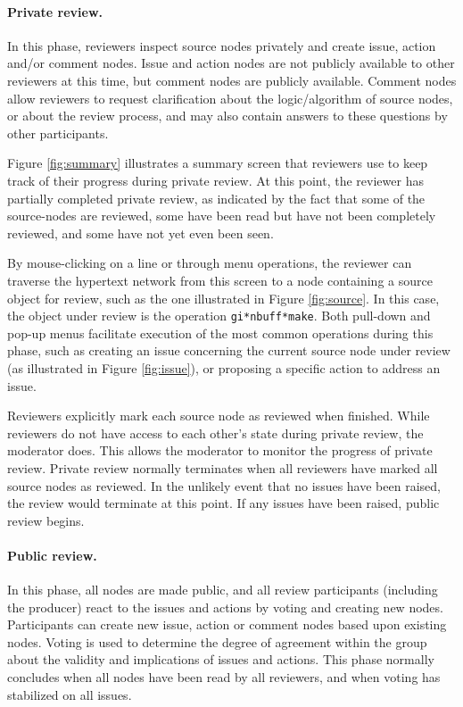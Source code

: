 \paragraph {Private review.} In this phase, reviewers inspect source nodes
privately and create issue, action and/or comment nodes.  Issue and action
nodes are not publicly available to other reviewers at this time, but
comment nodes are publicly available.  Comment nodes allow reviewers to
request clarification about the logic/algorithm of source nodes, or about
the review process, and may also contain answers to these questions by other
participants.

Figure \ref{fig:summary} illustrates a summary screen that reviewers use to
keep track of their progress during private review.  At this point, the
reviewer has partially completed private review, as indicated by the fact
that some of the source-nodes are reviewed, some have been read but have
not been completely reviewed, and some have not yet even been seen.

By mouse-clicking on a line or through menu operations, the reviewer can
traverse the hypertext network from this screen to a node containing a
source object for review, such as the one illustrated in Figure
\ref{fig:source}.  In this case, the object under review is the operation
{\tt gi*nbuff*make}.  Both pull-down and pop-up menus facilitate execution
of the most common operations during this phase, such as creating an issue
concerning the current source node under review (as illustrated in Figure
\ref{fig:issue}), or proposing a specific action to address an issue.

Reviewers explicitly mark each source node as reviewed when finished. While
reviewers do not have access to each other's state during private review,
the moderator does.  This allows the moderator to monitor the progress of
private review.  Private review normally terminates when all reviewers have
marked all source nodes as reviewed. In the unlikely event that no issues
have been raised, the review would terminate at this point.  If any issues
have been raised, public review begins.

\paragraph{Public review.} In this phase, all nodes are made public, and all review
participants (including the producer) react to the issues and actions by
voting and creating new nodes.  Participants can create new issue, action
or comment nodes based upon existing nodes.  Voting is used to determine
the degree of agreement within the group about the validity and
implications of issues and actions.  This phase normally concludes when all
nodes have been read by all reviewers, and when voting has stabilized on
all issues.

